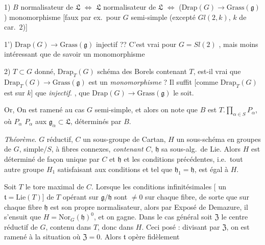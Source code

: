 \documentclass[11pt,a4paper]{article}
\begin{document}

1) $B$ normalisateur de $\mathfrak{L}$ $\iff$ $\mathfrak{L}$ normalisateur de
$\mathfrak{L}$ $\iff$ ($\mathrm{Drap}(G) \to \mathrm{Grass}(\mathfrak{g})$)
monomorphisme [faux par ex.\ pour $G$ semi-simple
 (excepté $Gl(2,k)$, $k$ de car.\ $2$)]


1') $\mathrm{Drap}(G) \to \mathrm{Grass}(\mathfrak{g})$ injectif ??
C'est vrai pour $G = Sl(2)$ \struck{\ill{}}, mais moins
intéressant que de savoir  un monomorphisme

2) $T \subset G$  donné, $\mathrm{Drap}_T(G)$
schéma des Borels contenant $T$, est-il vrai que
$\mathrm{Drap}_T(G) \to \mathrm{Grass}(\mathfrak{g})$ est un
\emph{monomorphisme} ?
 Il suffit [comme $\mathrm{Drap}_T(G)$ est
 sur $k$] que  \emph{injectif}.
, que
$\mathrm{Drap}(G) \to \mathrm{Grass}(\mathfrak{g})$ le soit.

Or,  On est ramené au cas $G$
semi-simple, et alors on note que
$B$ est   $T . \prod_{\alpha \in S} P_\alpha$, où
  $P_\alpha$ 
 \ill{} \ill{} $P_\alpha$ \ill{} \ill{}
aux $\mathfrak{g}_\alpha \subset \mathfrak{L}$, \ill{} déterminés par $B$.


\emph{Théorème}. $G$  réductif, $C$ un sous-groupe
de Cartan, $H$ un sous-schéma en groupes de $G$, simple$/S$, à fibres
connexes, \emph{contenant $C$}, $\mathfrak{h}$ 
\struck{\ill{}} sa sous-alg.\ de Lie. Alors $H$ est déterminé de
façon unique par $C$ et $\mathfrak{h}$ et les conditions
précédentes, i.e.\ tout autre groupe $H_1$ satisfaisant
aux conditions et tel que $\mathfrak{h}_1 = \mathfrak{h}$, est égal à $H$.

 Soit $T$ le tore maximal de $C$.
Lorsque les conditions infinitésimales [\ill{} un
$\mathfrak{t} = \mathrm{Lie}(T)$] de $T$ opérant sur $\mathfrak{g}/\mathfrak{h}$
sont $\neq 0$ sur chaque fibre, de sorte que sur
chaque fibre $\mathfrak{h}$ est son propre normalisateur, alors par
Exposé de Demazure, il s'ensuit que $H = \mathrm{Nor}_G(\mathfrak{h})^0$,
et on gagne. Dans le cas général soit
$\mathfrak{Z}$ le centre réductif de $G$, contenu dans $T$,
donc dans $H$. Ceci posé : divisant par
$\mathfrak{Z}$, \struck{\ill{}} on est ramené à la situation où
$\mathfrak{Z} = 0$. Alors $\mathfrak{t}$ opère fidèlement
\end{document}
